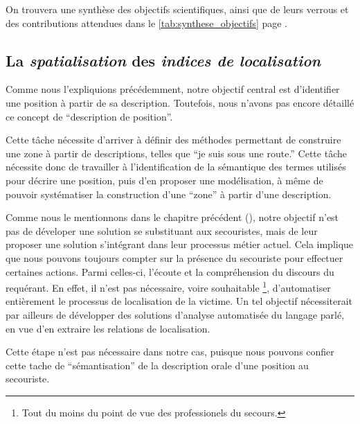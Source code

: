 
On trouvera une synthèse des objectifs scientifiques, ainsi que de
leurs verrous et des contributions attendues dans le
\autoref{tab:synthese_objectifs} page
\pageref{tab:synthese_objectifs}.

\subsection{La \emph{spatialisation} des \emph{indices de
    localisation}}
\label{subsec:2-1-1}


Comme nous l'expliquions précédemment, notre objectif central est
d'identifier une position à partir de sa description. Toutefois, nous
n'avons pas encore détaillé ce concept de \enquote{description de
  position}.

%
Cette tâche nécessite d'arriver à définir des méthodes permettant de
construire une zone à partir de descriptions, telles que \enquote{je
  suis sous une route.} Cette tâche nécessite donc de travailler à
l'identification de la sémantique des termes utilisés pour décrire une
position, puis d'en proposer une modélisation, à même de pouvoir
systématiser la construction d'une \enquote{zone} à partir d'une
description.

Comme nous le mentionnons dans le chapitre précédent (), notre
objectif n'est pas de déveloper une solution se substituant aux
secouristes, mais de leur proposer une solution s'intégrant dans leur
processus métier actuel. Cela implique que nous pouvons toujours
compter sur la présence du secouriste pour effectuer certaines
actions. Parmi celles-ci, l'écoute et la compréhension du discours du
requérant. En effet, il n'est pas nécessaire, voire souhaitable
\footnote{Tout du moins du point de vue des professionels du
  secours.}, d'automatiser entièrement le processus de localisation de
la victime. Un tel objectif nécessiterait par ailleurs de développer
des solutions d'analyse automatisée du langage parlé, en vue d'en
extraire les relations de localisation.

Cette étape n'est pas nécessaire dans notre cas, puisque nous pouvons
confier cette tache de \enquote{sémantisation} de la description orale
d'une position au secouriste. 

